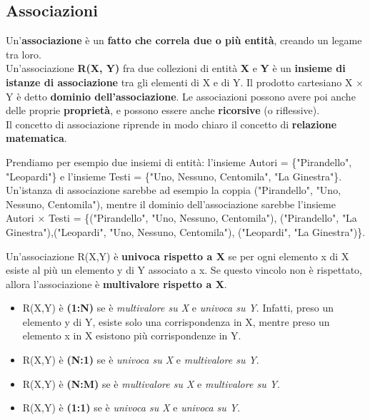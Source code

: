 \documentclass[11pt, a4paper, titlepage, oneside]{scrbook}
\begin{document}
\subsection{Associazioni}

\begin{Definizione}[Associazioni]
\label{def-associazioni}
Un'\textbf{associazione} è un \textbf{fatto che correla due o più entità}, creando un legame tra loro. \\
Un'associazione \textbf{R(X, Y)} fra due collezioni di entità \textbf{X} e \textbf{Y} è un \textbf{insieme di istanze di associazione} tra gli elementi di X e di Y. Il prodotto cartesiano X $\times$ Y è detto \textbf{dominio dell'associazione}. Le associazioni possono avere poi anche delle proprie \textbf{proprietà}, e possono essere anche \textbf{ricorsive} (o riflessive). \\
\NB Il concetto di associazione riprende in modo chiaro il concetto di \textbf{relazione matematica}.
\end{Definizione}

Prendiamo per esempio due insiemi di entità: l'insieme Autori = \{"Pirandello", "Leopardi"\} e l'insieme Testi = \{"Uno, Nessuno, Centomila", "La Ginestra"\}. Un'istanza di associazione sarebbe ad esempio la coppia ("Pirandello", "Uno, Nessuno, Centomila"), mentre il dominio dell'associazione sarebbe l'insieme Autori $\times$ Testi = \{("Pirandello", "Uno, Nessuno, Centomila"), ("Pirandello", "La Ginestra"),("Leopardi", "Uno, Nessuno, Centomila"), ("Leopardi", "La Ginestra")\}.

\begin{Proprieta}
\label{prop-vincolo-molteplicita}
Un'associazione R(X,Y) è \textbf{univoca rispetto a X} se per ogni elemento x di X esiste al più un elemento y di Y associato a x. Se questo vincolo non è rispettato, allora l'associazione è \textbf{multivalore rispetto a X}.
\end{Proprieta}

\begin{itemize}
    \item R(X,Y) è \textbf{(1:N)} se è \textit{multivalore su X} e \textit{univoca su Y}. Infatti, preso un elemento y di Y, esiste solo una corrispondenza in X, mentre preso un elemento x in X esistono più corrispondenze in Y.
    \item R(X,Y) è \textbf{(N:1)} se è \textit{univoca su X} e \textit{multivalore su Y}.
    \item R(X,Y) è \textbf{(N:M)} se è \textit{multivalore su X} e \textit{multivalore su Y}.
    \item R(X,Y) è \textbf{(1:1)} se è \textit{univoca su X} e \textit{univoca su Y}.
\end{itemize}
\end{document}
